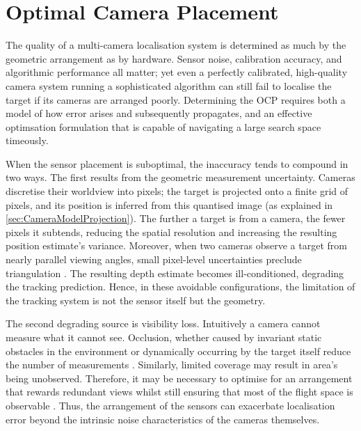 \chapter{Optimal Camera Placement}
\label{OCP}
The quality of a multi-camera localisation system is determined as much by the geometric arrangement as by hardware. Sensor noise, calibration accuracy, and algorithmic performance all matter; yet even a perfectly calibrated, high-quality camera system running a sophisticated algorithm can still fail to localise the target if its cameras are arranged poorly. Determining the \gls{OCP} requires both a model of how error arises and subsequently propagates, and an effective optimsation formulation that is capable of navigating a large search space timeously. 

When the sensor placement is suboptimal, the inaccuracy tends to compound in two ways. The first results from the geometric measurement uncertainty. Cameras discretise their worldview into pixels; the target is projected onto a finite grid of pixels, and its position is inferred from this quantised image (as explained in \ref{sec:CameraModelProjection}). The further a target is from a camera, the fewer pixels it subtends, reducing the spatial resolution and increasing the resulting position estimate's variance. Moreover, when two cameras observe a target from nearly parallel viewing angles, small pixel-level uncertainties preclude triangulation \parencite{sharmaAnalysisUncertaintyBounds1998}. The resulting depth estimate becomes ill-conditioned, degrading the tracking prediction. Hence, in these avoidable configurations, the limitation of the tracking system is not the sensor itself but the geometry.

The second degrading source is visibility loss. Intuitively a camera cannot measure what it cannot see. Occlusion, whether caused by invariant static obstacles in the environment or dynamically occurring by the target itself reduce the number of measurements \parencite{rahimianOptimalCameraPlacement2017}. Similarly, limited coverage may result in area's being unobserved. Therefore, it may be necessary to optimise for an arrangement that rewards redundant views whilst still ensuring that most of the flight space is observable \parencite{aissaouiDesigningCameraPlacement2018}. Thus, the arrangement of the sensors can exacerbate localisation error beyond the intrinsic noise characteristics of the cameras themselves. 

